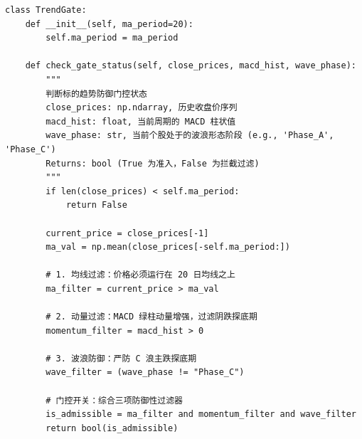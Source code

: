 \documentclass[11pt,a4paper]{article}
\begin{document}
\begin{lstlisting}
class TrendGate:
    def __init__(self, ma_period=20):
        self.ma_period = ma_period

    def check_gate_status(self, close_prices, macd_hist, wave_phase):
        """
        判断标的趋势防御门控状态
        close_prices: np.ndarray, 历史收盘价序列
        macd_hist: float, 当前周期的 MACD 柱状值
        wave_phase: str, 当前个股处于的波浪形态阶段 (e.g., 'Phase_A', 'Phase_C')
        Returns: bool (True 为准入，False 为拦截过滤)
        """
        if len(close_prices) < self.ma_period:
            return False
            
        current_price = close_prices[-1]
        ma_val = np.mean(close_prices[-self.ma_period:])
        
        # 1. 均线过滤：价格必须运行在 20 日均线之上
        ma_filter = current_price > ma_val
        
        # 2. 动量过滤：MACD 绿柱动量增强，过滤阴跌探底期
        momentum_filter = macd_hist > 0
        
        # 3. 波浪防御：严防 C 浪主跌探底期
        wave_filter = (wave_phase != "Phase_C")
        
        # 门控开关：综合三项防御性过滤器
        is_admissible = ma_filter and momentum_filter and wave_filter
        return bool(is_admissible)
\end{lstlisting}
\end{document}
